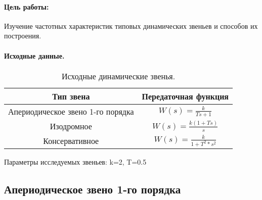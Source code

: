 \documentclass[12pt,a4paper]{article}
\begin{document}


\paragraph{Цель работы:}Изучение частотных характеристик типовых динамических звеньев и способов их построения.%
\paragraph{Исходные данные.}
\begin{table}[h!]
	\renewcommand{\arraystretch}{1.8} %
	\centering
	\begin{threeparttable}
	\caption{Исходные динамические звенья.}
	\begin{tabular}{|c|c|}
		\hline Тип звена & Передаточная функция\\
		\hline Апериодическое звено 1-го порядка & $W(s) = \displaystyle{\frac{k}{Ts + 1}}$ \\
		\hline Изодромное & $W(s) = \displaystyle{\frac{k(1+Ts)}{s}}$ \\
		\hline Консервативное & $W(s) = \displaystyle{\frac{k}{1+T^2*s^2}}$ \\
		\hline
	\end{tabular}
	\end{threeparttable}
\end{table} 
\par Параметры исследуемых звеньев: k=2, T=0.5

\newpage
\begin{center}
\section{Апериодическое звено 1-го порядка}
\end{center}
\end{document}
